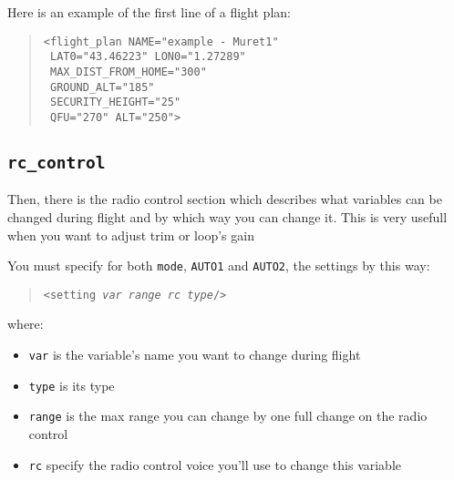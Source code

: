 \documentclass{article}
\renewcommand{\tt}[1]{\texttt{#1}}
\newcommand{\ex}[1]{\colorbox[gray]{0.92}{\tt{#1}}}
\newcommand{\hs}[1]{\hspace*{#1cm}}
\newcommand{\qt}[1]{\textcolor{gris75}{#1}}
\begin{document}
\begin{minipage}[ctb]{\textwidth}
Here is an example of the first line of a flight plan:
\begin{quote}
	\ex{<flight\_plan NAME="\qt{example - Muret1}"} \\
	\ex{\hs{2.2} LAT0="\qt{43.46223}" LON0="\qt{1.27289}"} \\
	\ex{\hs{2.2} MAX\_DIST\_FROM\_HOME="\qt{300}"} \\
	\ex{\hs{2.2} GROUND\_ALT="\qt{185}"} \\
	\ex{\hs{2.2} SECURITY\_HEIGHT="\qt{25}"} \\
	\ex{\hs{2.2} QFU="\qt{270}" ALT="\qt{250}">} \\
\end{quote}
\end{minipage}


\hypertarget{rccontrol}{\subsection{\tt{rc\_control}}}
Then, there is the radio control section which describes what variables can be changed during flight and by which way you can change it.
This is very usefull when you want to adjust trim or loop's gain 

You must specify for both \tt{mode}, \tt{AUTO1} and \tt{AUTO2}, the settings by this way:
	\begin{quote}
		\tt{<setting \emph{var range rc type}/>}
	\end{quote}
\par

where:
\begin{itemize}
	\item \tt{var} is the variable's name you want to change during flight
	\item \tt{type} is its type
	\item \tt{range} is the max range you can change by one full change on the radio control
	\item \tt{rc} specify the radio control voice you'll use to change this variable \\
\end{itemize}
\end{document}
